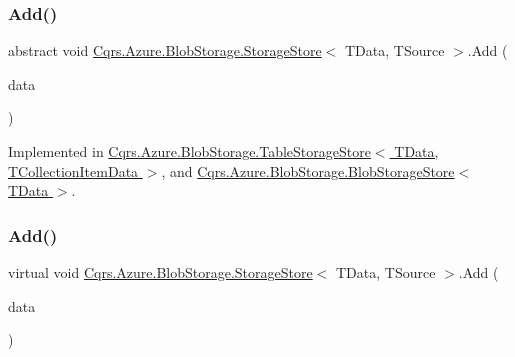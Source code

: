 \subsubsection{\texorpdfstring{Add()}{Add()}\hspace{0.1cm}{\footnotesize\ttfamily [1/2]}}
{\footnotesize\ttfamily abstract void \hyperlink{classCqrs_1_1Azure_1_1BlobStorage_1_1StorageStore}{Cqrs.\+Azure.\+Blob\+Storage.\+Storage\+Store}$<$ T\+Data, T\+Source $>$.Add (\begin{DoxyParamCaption}\item[{T\+Data}]{data }\end{DoxyParamCaption})\hspace{0.3cm}{\ttfamily [pure virtual]}}



Implemented in \hyperlink{classCqrs_1_1Azure_1_1BlobStorage_1_1TableStorageStore_ad9becfb4b149c645450deba342696e54_ad9becfb4b149c645450deba342696e54}{Cqrs.\+Azure.\+Blob\+Storage.\+Table\+Storage\+Store$<$ T\+Data, T\+Collection\+Item\+Data $>$}, and \hyperlink{classCqrs_1_1Azure_1_1BlobStorage_1_1BlobStorageStore_a527ef0e0d39f9e01f4112b6bc90129b2_a527ef0e0d39f9e01f4112b6bc90129b2}{Cqrs.\+Azure.\+Blob\+Storage.\+Blob\+Storage\+Store$<$ T\+Data $>$}.

\mbox{\label{classCqrs_1_1Azure_1_1BlobStorage_1_1StorageStore_a989d749e5f9efc10b1a416feec02657d_a989d749e5f9efc10b1a416feec02657d}} 
\subsubsection{\texorpdfstring{Add()}{Add()}\hspace{0.1cm}{\footnotesize\ttfamily [2/2]}}
{\footnotesize\ttfamily virtual void \hyperlink{classCqrs_1_1Azure_1_1BlobStorage_1_1StorageStore}{Cqrs.\+Azure.\+Blob\+Storage.\+Storage\+Store}$<$ T\+Data, T\+Source $>$.Add (\begin{DoxyParamCaption}\item[{I\+Enumerable$<$ T\+Data $>$}]{data }\end{DoxyParamCaption})\hspace{0.3cm}{\ttfamily [virtual]}}



